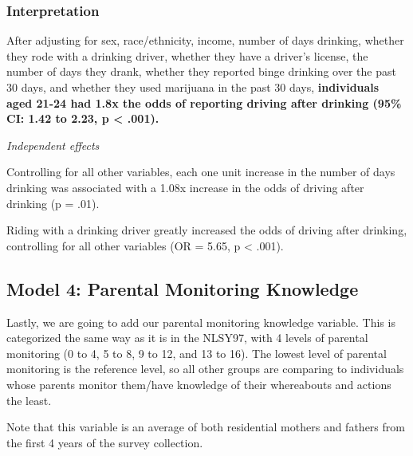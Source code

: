 \documentclass[
]{article}
\begin{document}
\subsubsection{Interpretation}\label{interpretation-2}

After adjusting for sex, race/ethnicity, income, number of days
drinking, whether they rode with a drinking driver, whether they have a
driver's license, the number of days they drank, whether they reported
binge drinking over the past 30 days, and whether they used marijuana in
the past 30 days, \textbf{individuals aged 21-24 had 1.8x the odds of
reporting driving after drinking (95\% CI: 1.42 to 2.23, p \textless{}
.001).}

\emph{Independent effects}

Controlling for all other variables, each one unit increase in the
number of days drinking was associated with a 1.08x increase in the odds
of driving after drinking (p = .01).

Riding with a drinking driver greatly increased the odds of driving
after drinking, controlling for all other variables (OR = 5.65, p
\textless{} .001).

\subsection{Model 4: Parental Monitoring
Knowledge}\label{model-4-parental-monitoring-knowledge}

Lastly, we are going to add our parental monitoring knowledge variable.
This is categorized the same way as it is in the NLSY97, with 4 levels
of parental monitoring (0 to 4, 5 to 8, 9 to 12, and 13 to 16). The
lowest level of parental monitoring is the reference level, so all other
groups are comparing to individuals whose parents monitor them/have
knowledge of their whereabouts and actions the least.

Note that this variable is an average of both residential mothers and
fathers from the first 4 years of the survey collection.
\end{document}
